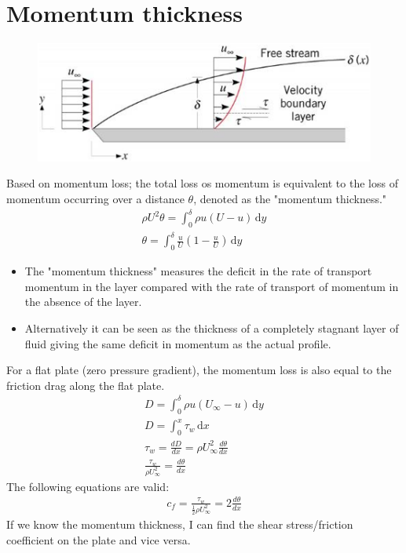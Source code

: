 \documentclass[class=report, crop=false, 12pt,a4paper]{standalone}
\begin{document}
\section{Momentum thickness}
\begin{figure}[H]
  \centering
  \includegraphics[width = 0.8 \textwidth]{../img/diagram73.png}
  \caption{}
\end{figure}
Based on momentum loss; the total loss os momentum is equivalent to the loss of momentum occurring over a distance $\theta$, denoted as the "momentum thickness."
\begin{gather}
  \rho U^2 \theta = \int_{0}^{\delta} \rho u (U - u) \,\mathrm{d}y\\
  \theta = \int_{0}^{\delta} \frac{u}{U} \left(1 - \frac{u}{U}\right) \,\mathrm{d}y
\end{gather}
\begin{itemize}
  \item The "momentum thickness" measures the deficit in the rate of transport momentum in the layer compared with the rate of transport of momentum in the absence of the layer.
  \item Alternatively it can be seen as the thickness of a completely stagnant layer of fluid giving the same deficit in momentum as the actual profile.
\end{itemize}
For a flat plate (zero pressure gradient), the momentum loss is also equal to the friction drag along the flat plate. 
\begin{gather}
  D = \int_{0}^{\delta} \rho u (U_\infty - u) \,\mathrm{d}y\\
  D = \int_{0}^{x} \tau_w \,\mathrm{d}x\\
  \tau_w = \frac{dD}{dx} = \rho U_\infty^2 \frac{d\theta}{dx}\\
  \frac{\tau_w}{\rho U_\infty^2} = \frac{d\theta}{dx}
\end{gather}
The following equations are valid:
\begin{align}
  c_f = \frac{\tau_w}{\frac{1}{2}\rho U_\infty^2} = 2\frac{d\theta}{dx}
\end{align}
If we know the momentum thickness, I can find the shear stress/friction coefficient on the plate and vice versa.
\end{document}
